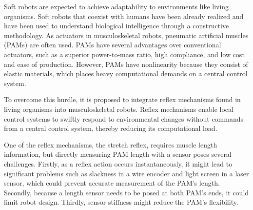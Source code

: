 Soft robots are expected to achieve adaptability to environments like living organisms\cite{rus_design_2015}. 
Soft robots that coexist with humans have been already realized\cite{Compac,polygerinos_soft_2015} and have been used to understand biological intelligence through a constructive methodology\cite{hosoda,marchese_autonomous}.
As actuators in musculoskeletal robots, pneumatic artificial muscles (PAMs) are often used\cite{mirvakili_artificial}.
PAMs have several advantages over conventional actuators, such as a superior power-to-mass ratio\cite{dynamic}, high compliance\cite{SDCharacteristics}, and low cost and ease of production\cite{ashwin_survey_2018}.
However, PAMs have nonlinearity because they consist of elastic materials, which places heavy computational demands on a central control system.

To overcome this hurdle, it is proposed to integrate reflex mechanisms found in living organisms into musculoskeletal robots\cite{takahashi}.
Reflex mechanisms enable local control systems to swiftly respond to environmental changes without commands from a central control system, thereby reducing its computational load. 

One of the reflex mechanisms, the stretch reflex, requires muscle length information\cite{kandel}, but directly measuring PAM length with a sensor poses several challenges\cite{nakajima}.
Firstly, as a reflex action occurs instantaneously, it might lead to significant problems such as slackness in a wire encoder and light screen in a laser sensor, 
which could prevent accurate measurement of the PAM's length. 
Secondly, because a length sensor needs to be posed at both PAM's ends, it could limit robot design. 
Thirdly, sensor stiffness might reduce the PAM's flexibility.

